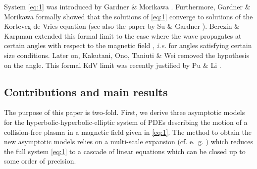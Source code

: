\documentclass[final,11pt,a4paper,reqno]{amsart}
\theoremstyle{definition}
\begin{document}
System \eqref{eq:1} was introduced by Gardner \& Morikawa \cite{gardner1960similarity}. Furthermore, Gardner \& Morikawa formally showed that the solutions of \eqref{eq:1} converge to solutions of the Korteveg-de Vries equation (see also the paper by Su \& Gardner \cite{su1969korteweg}). Berezin \& Karpman extended this formal limit to the case where the wave propagates at certain angles with respect to the magnetic field \cite{berezin1964theory}, \emph{i.e.} for angles satisfying certain size conditions. Later on, Kakutani, Ono, Taniuti \& Wei \cite{kakutani1968reductive} removed the hypothesis on the angle. This formal KdV limit was recently justified by Pu \& Li \cite{pu2019kdv}. 




\subsection{Contributions and main results}
The purpose of this paper is two-fold. First, we derive three asymptotic models for the hyperbolic-hyperbolic-elliptic system of PDEs describing the motion of a collision-free plasma in a magnetic field given in \eqref{eq:1}. The method to obtain the new asymptotic models relies on a multi-scale expansion (cf.  e.~g. \cite{AloranWaves, CL14,CL15,CLS12,CGSW18,granero2018asymptotic,GS}) which reduces the full system \eqref{eq:1} to a cascade of linear equations which can be closed up to some order of precision. 
\end{document}
